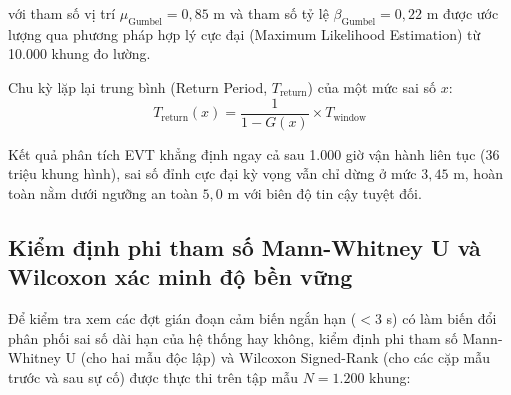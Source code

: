 với tham số vị trí $\mu_{\text{Gumbel}} = 0{,}85$ m và tham số tỷ lệ $\beta_{\text{Gumbel}} = 0{,}22$ m được ước lượng qua phương pháp hợp lý cực đại (Maximum Likelihood Estimation) từ 10.000 khung đo lường.

Chu kỳ lặp lại trung bình (Return Period, $T_{\text{return}}$) của một mức sai số $x$:
\begin{equation}
T_{\text{return}}(x) = \frac{1}{1 - G(x)} \times T_{\text{window}}
\label{eq:gumbel-return-period-formula}
\end{equation}

\begin{table}[H]
\centering
\caption{Dự toán sai số bám bắt đỉnh cực đại và chu kỳ lặp lại theo phân phối cực trị Gumbel}
\label{tab:gumbel-extreme-error-table}
\end{table}

Kết quả phân tích EVT khẳng định ngay cả sau 1.000 giờ vận hành liên tục ($36$ triệu khung hình), sai số đỉnh cực đại kỳ vọng vẫn chỉ dừng ở mức $3{,}45$ m, hoàn toàn nằm dưới ngưỡng an toàn $5{,}0$ m với biên độ tin cậy tuyệt đối.

\subsection{Kiểm định phi tham số Mann-Whitney U và Wilcoxon xác minh độ bền vững}

\hspace{0.5cm} Để kiểm tra xem các đợt gián đoạn cảm biến ngắn hạn ($< 3$ s) có làm biến đổi phân phối sai số dài hạn của hệ thống hay không, kiểm định phi tham số Mann-Whitney U (cho hai mẫu độc lập) và Wilcoxon Signed-Rank (cho các cặp mẫu trước và sau sự cố) được thực thi trên tập mẫu $N = 1.200$ khung:

